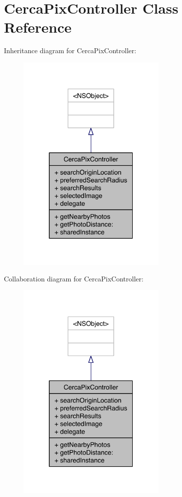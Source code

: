 \hypertarget{interface_cerca_pix_controller}{\section{Cerca\-Pix\-Controller Class Reference}
\label{interface_cerca_pix_controller}
}


Inheritance diagram for Cerca\-Pix\-Controller\-:\nopagebreak
\begin{figure}[H]
\begin{center}
\leavevmode
\includegraphics[width=208pt]{interface_cerca_pix_controller__inherit__graph}
\end{center}
\end{figure}


Collaboration diagram for Cerca\-Pix\-Controller\-:\nopagebreak
\begin{figure}[H]
\begin{center}
\leavevmode
\includegraphics[width=208pt]{interface_cerca_pix_controller__coll__graph}
\end{center}
\end{figure}
